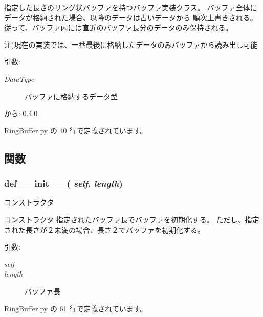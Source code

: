 指定した長さのリング状バッファを持つバッファ実装クラス。 バッファ全体にデータが格納された場合、以降のデータは古いデータから 順次上書きされる。 従って、バッファ内には直近のバッファ長分のデータのみ保持される。

注)現在の実装では、一番最後に格納したデータのみバッファから読み出し可能

\begin{Desc}
\item[引数:]
\begin{description}
\item[{\em DataType}]バッファに格納するデータ型\end{description}
\end{Desc}
\begin{Desc}
\item[から:]0.4.0 \end{Desc}


 RingBuffer.py の 40 行で定義されています。

\subsection{関数}
\subsubsection{\setlength{\rightskip}{0pt plus 5cm}def \_\-\_\-init\_\-\_\- ( {\em self},  {\em length})}\label{classsource__py_1_1_ring_buffer_1_1_ring_buffer_c775ee34451fdfa742b318538164070e}


コンストラクタ 

コンストラクタ 指定されたバッファ長でバッファを初期化する。 ただし、指定された長さが２未満の場合、長さ２でバッファを初期化する。

\begin{Desc}
\item[引数:]
\begin{description}
\item[{\em self}]\item[{\em length}]バッファ長 \end{description}
\end{Desc}


 RingBuffer.py の 61 行で定義されています。
